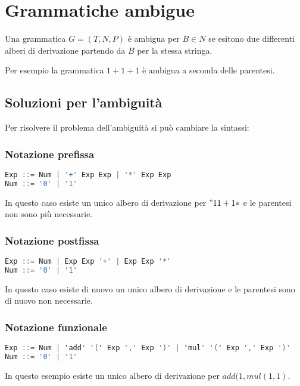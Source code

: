 \chapter{Grammatiche ambigue}
\begin{theorem}
  Una grammatica $G=(T,N,P)$ è ambigua per $B\in N$ se esitono due differenti
  alberi di derivazione partendo da $B$ per la stessa stringa.
\end{theorem}

Per esempio la grammatica $1+1+1$ è ambigua a seconda delle parentesi.

\section{Soluzioni per l'ambiguità}
Per risolvere il problema dell'ambiguità si può cambiare la sintassi:
\subsection{Notazione prefissa}
\begin{lstlisting}[language=Java, caption={Notazione prefissa}]
Exp ::= Num | '+' Exp Exp | '*' Exp Exp
Num ::= '0' | '1'
\end{lstlisting}

In questo caso esiste un unico albero di derivazione per $"1 1+1*$ e le
parentesi non sono più necessarie.

\subsection{Notazione postfissa}
\begin{lstlisting}[language=Java, caption={Notazione postfissa}]
Exp ::= Num | Exp Exp '+' | Exp Exp '*'
Num ::= '0' | '1'
\end{lstlisting}

In questo caso esiste di nuovo un unico albero di derivazione e le parentesi
sono di nuovo non necessarie.
 
\subsection{Notazione funzionale}
\begin{lstlisting}[language=Java, caption={Notazione funzionale}]
Exp ::= Num | 'add' '(' Exp ',' Exp ')' | 'mul' '(' Exp ',' Exp ')'
Num ::= '0' | '1'
\end{lstlisting}

In questo esempio esiste un unico albero di derivazione per $add(1,mul(1,1)$.

